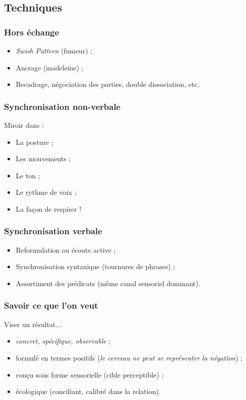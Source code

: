 \documentclass{beamer}
\begin{document}
\subsection{Techniques}
\begin{frame}
	\frametitle{Hors échange} 
	\begin{itemize}
		\item \emph{Swish Pattern} (fumeur) ; 
		\item Ancrage (madeleine) ; 
		\item Recadrage, négociation des parties, double dissociation, etc. 
	\end{itemize}
\end{frame}
\begin{frame}
	\frametitle{Synchronisation non-verbale} Miroir dans : 
	\begin{itemize}
		\item La posture ; 
		\item Les mouvements ; 
		\item Le ton ; 
		\item Le rythme de voix ; 
		\item La façon de respirer ! 
	\end{itemize}
\end{frame}
\begin{frame}
	\frametitle{Synchronisation verbale} 
	\begin{itemize}
		\item Reformulation ou écoute active ; 
		\item Synchronisation syntaxique (tournures de phrases) ; 
		\item Assortiment des prédicats (même canal sensoriel dominant). 
	\end{itemize}
\end{frame}
\begin{frame}
	\frametitle{Savoir ce que l'on veut} 
	\begin{block}
		{Viser un résultat...} 
		\begin{itemize}
			\item \emph{concret, spécifique, observable} ; 
			\item formulé en termes positifs (\emph{le cerveau ne peut se représenter la négation}) ; 
			\item conçu sous forme sensorielle (cible perceptible) ; 
			\item écologique (conciliant, calibré dans la relation). 
		\end{itemize}
	\end{block}
\end{frame}
\end{document}
